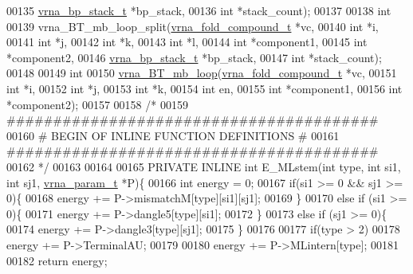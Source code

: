 \begin{DoxyCode}
00135                       \hyperlink{group__data__structures_structvrna__bp__stack__s}{vrna\_bp\_stack\_t} *bp\_stack,
00136                       \textcolor{keywordtype}{int} *stack\_count);
00137 
00138 \textcolor{keywordtype}{int}
00139 vrna\_BT\_mb\_loop\_split(\hyperlink{group__fold__compound_structvrna__fc__s}{vrna\_fold\_compound\_t} *vc,
00140                       \textcolor{keywordtype}{int} *i,
00141                       \textcolor{keywordtype}{int} *j,
00142                       \textcolor{keywordtype}{int} *k,
00143                       \textcolor{keywordtype}{int} *l,
00144                       \textcolor{keywordtype}{int} *component1,
00145                       \textcolor{keywordtype}{int} *component2,
00146                       \hyperlink{group__data__structures_structvrna__bp__stack__s}{vrna\_bp\_stack\_t} *bp\_stack,
00147                       \textcolor{keywordtype}{int} *stack\_count);
00148 
00149 \textcolor{keywordtype}{int}
00150 \hyperlink{group__loops_ga9cb520ddfd8b3a48089a7910b045d06b}{vrna\_BT\_mb\_loop}(\hyperlink{group__fold__compound_structvrna__fc__s}{vrna\_fold\_compound\_t} *vc,
00151                 \textcolor{keywordtype}{int} *i,
00152                 \textcolor{keywordtype}{int} *j,
00153                 \textcolor{keywordtype}{int} *k,
00154                 \textcolor{keywordtype}{int} en,
00155                 \textcolor{keywordtype}{int} *component1,
00156                 \textcolor{keywordtype}{int} *component2);
00157 
00158 \textcolor{comment}{/*}
00159 \textcolor{comment}{########################################}
00160 \textcolor{comment}{# BEGIN OF INLINE FUNCTION DEFINITIONS #}
00161 \textcolor{comment}{########################################}
00162 \textcolor{comment}{*/}
00163 
00164 
00165 PRIVATE INLINE \textcolor{keywordtype}{int} E\_MLstem(\textcolor{keywordtype}{int} type, \textcolor{keywordtype}{int} si1, \textcolor{keywordtype}{int} sj1, \hyperlink{group__energy__parameters_structvrna__param__s}{vrna\_param\_t} *P)\{
00166   \textcolor{keywordtype}{int} energy = 0;
00167   \textcolor{keywordflow}{if}(si1 >= 0 && sj1 >= 0)\{
00168     energy += P->mismatchM[type][si1][sj1];
00169   \}
00170   \textcolor{keywordflow}{else} \textcolor{keywordflow}{if} (si1 >= 0)\{
00171     energy += P->dangle5[type][si1];
00172   \}
00173   \textcolor{keywordflow}{else} \textcolor{keywordflow}{if} (sj1 >= 0)\{
00174     energy += P->dangle3[type][sj1];
00175   \}
00176 
00177   \textcolor{keywordflow}{if}(type > 2)
00178     energy += P->TerminalAU;
00179 
00180   energy += P->MLintern[type];
00181 
00182   \textcolor{keywordflow}{return} energy;

\end{DoxyCode}
